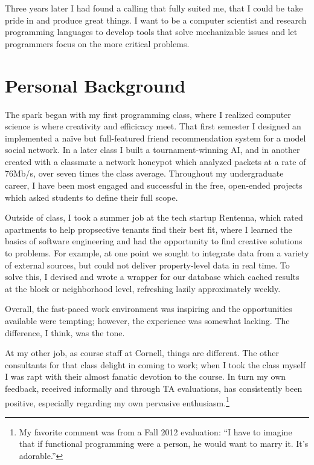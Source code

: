 \documentclass{article}
\begin{document}
Three years later I had found a calling that fully suited me, that I could be take pride in and produce great things. 
I want to be a computer scientist and research programming languages to develop tools that solve mechanizable issues and let programmers focus on the more critical problems.

\section{Personal Background}

The spark began with my first programming class, where I realized computer science is where creativity and efficicacy meet. 
That first semester I designed an implemented a na\"ive but full-featured friend recommendation system for a model social network.
In a later class I built a tournament-winning AI, and in another created with a classmate a network honeypot which analyzed packets at a rate of 76Mb/s, over seven times the class average.
Throughout my undergraduate career, I have been most engaged and successful in the free, open-ended projects which asked students to define their full scope.

Outside of class, I took a summer job at the tech startup Rentenna, which rated apartments to help propsective tenants find their best fit, where I learned the basics of software engineering and had the opportunity to find creative solutions to problems.
For example, at one point we sought to integrate data from a variety of external sources, but could not deliver property-level data in real time.
To solve this, I devised and wrote a wrapper for our database which cached results at the block or neighborhood level, refreshing lazily approximately weekly.

Overall, the fast-paced work environment was inspiring and the opportunities available were tempting; however, the experience was somewhat lacking.
The difference, I think, was the tone. 

At my other job, as course staff at Cornell, things are different.
The other consultants for that class delight in coming to work; when I took the class myself I was rapt with their almost fanatic devotion to the course. 
In turn my own feedback, received informally and through TA evaluations, has consistently been positive, especially regarding my own pervasive enthusiasm.\footnote{My favorite comment was from a Fall 2012 evaluation: ``I have to imagine that if functional programming were a person, he would want to marry it. It's adorable.''}
\end{document}
